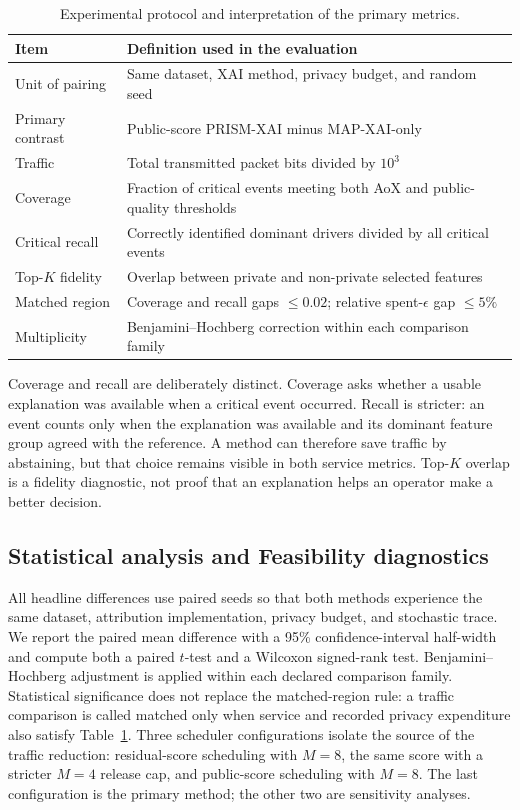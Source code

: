 \documentclass[conference]{IEEEtran}
\begin{document}
\begin{table}[t]
\caption{Experimental protocol and interpretation of the primary metrics.}
\label{tab:protocol}
\centering
\scriptsize
\setlength{\tabcolsep}{3pt}
\begin{tabular}{p{}p{}}
\toprule
Item & Definition used in the evaluation\\
\midrule
Unit of pairing & Same dataset, XAI method, privacy budget, and random seed\\
Primary contrast & Public-score PRISM-XAI minus MAP-XAI-only\\
Traffic & Total transmitted packet bits divided by $10^3$\\
Coverage & Fraction of critical events meeting both AoX and public-quality thresholds\\
Critical recall & Correctly identified dominant drivers divided by all critical events\\
Top-$K$ fidelity & Overlap between private and non-private selected features\\
Matched region & Coverage and recall gaps $\leq0.02$; relative spent-$\epsilon$ gap $\leq5\%$\\
Multiplicity & Benjamini--Hochberg correction within each comparison family\\
\bottomrule
\end{tabular}
\end{table}

Coverage and recall are deliberately distinct. Coverage asks whether a usable
explanation was available when a critical event occurred. Recall is stricter:
an event counts only when the explanation was available and its dominant
feature group agreed with the reference. A method can therefore save traffic
by abstaining, but that choice remains visible in both service metrics.
Top-$K$ overlap is a fidelity diagnostic, not proof that an explanation helps
an operator make a better decision.

\subsection{Statistical analysis and Feasibility diagnostics}

All headline differences use paired seeds so that both methods experience the
same dataset, attribution implementation, privacy budget, and stochastic
trace. We report the paired mean difference with a 95\% confidence-interval
half-width and compute both a paired $t$-test and a Wilcoxon signed-rank test.
Benjamini--Hochberg adjustment is applied within each declared comparison
family. Statistical significance does not replace the matched-region rule: a
traffic comparison is called matched only when service and recorded privacy
expenditure also satisfy Table~\ref{tab:protocol}.
Three scheduler configurations isolate the source of the traffic reduction:
residual-score scheduling with $M=8$, the same score with a stricter $M=4$
release cap, and public-score scheduling with $M=8$. The last configuration is
the primary method; the other two are sensitivity analyses.
\end{document}
